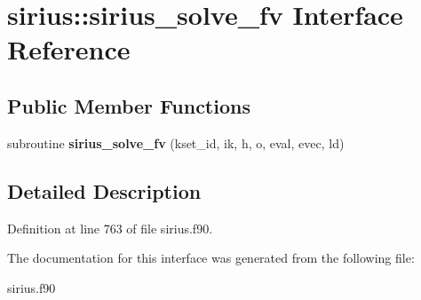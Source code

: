 \hypertarget{interfacesirius_1_1sirius__solve__fv}{}\section{sirius\+:\+:sirius\+\_\+solve\+\_\+fv Interface Reference}
\label{interfacesirius_1_1sirius__solve__fv}
\subsection*{Public Member Functions}
\begin{DoxyCompactItemize}
\item 
\hypertarget{interfacesirius_1_1sirius__solve__fv_a7ae19c4a9fb5d0bd71941f05fdd21168}{}subroutine {\bfseries sirius\+\_\+solve\+\_\+fv} (kset\+\_\+id, ik, h, o, eval, evec, ld)\label{interfacesirius_1_1sirius__solve__fv_a7ae19c4a9fb5d0bd71941f05fdd21168}

\end{DoxyCompactItemize}


\subsection{Detailed Description}


Definition at line 763 of file sirius.\+f90.



The documentation for this interface was generated from the following file\+:\begin{DoxyCompactItemize}
\item 
sirius.\+f90\end{DoxyCompactItemize}

